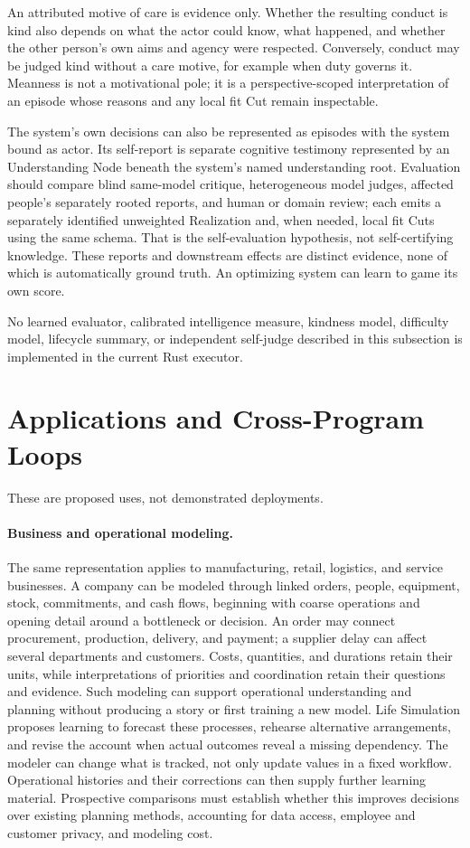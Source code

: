 \documentclass[10pt]{article}
\begin{document}
An attributed motive of care is evidence only. Whether the resulting conduct
is kind also depends on what the actor could know, what happened, and whether
the other person's own aims and agency were respected. Conversely, conduct may
be judged kind without a care motive, for example when duty governs it.
Meanness is not a motivational pole; it is a perspective-scoped interpretation of
an episode whose reasons and any local fit Cut remain inspectable.

The system's own decisions can also be represented as episodes with the system
bound as actor. Its self-report is separate cognitive testimony represented by
an Understanding Node beneath the system's named understanding root. Evaluation
should compare blind same-model critique, heterogeneous model judges, affected
people's separately rooted reports, and human or domain review; each emits a
separately identified unweighted Realization and, when needed, local fit Cuts
using the same schema. That is the
self-evaluation hypothesis, not self-certifying knowledge. These reports and
downstream effects are distinct evidence, none of which is automatically ground
truth. An optimizing system can learn to game its own score.

No learned evaluator, calibrated intelligence measure, kindness model,
difficulty model, lifecycle summary, or independent self-judge described in
this subsection is implemented in the current Rust executor.

\section{Applications and Cross-Program Loops}
\label{sec:applications}

These are proposed uses, not demonstrated deployments.

\paragraph{Business and operational modeling.}
The same representation applies to manufacturing, retail, logistics, and
service businesses. A company can be modeled through linked orders, people,
equipment, stock, commitments, and cash flows, beginning with coarse operations
and opening detail around a bottleneck or decision. An order may connect
procurement, production, delivery, and payment; a supplier delay can affect
several departments and customers. Costs, quantities, and durations retain
their units, while interpretations of priorities and coordination retain their
questions and evidence. Such modeling can support operational understanding
and planning without producing a story or first training a new model.
Life Simulation proposes learning to forecast these processes, rehearse
alternative arrangements, and revise the account when actual outcomes reveal
a missing dependency. The modeler can change what is tracked, not only update
values in a fixed workflow. Operational histories and their corrections can
then supply further learning material. Prospective comparisons must establish
whether this improves decisions over existing planning methods, accounting for
data access, employee and customer privacy, and modeling cost.
\end{document}
